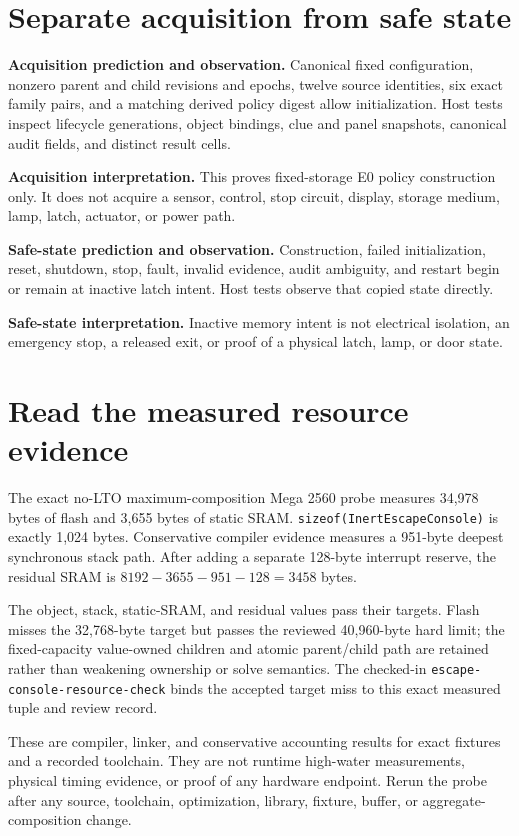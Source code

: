 \documentclass[10pt]{article}
\begin{document}
\section{Separate acquisition from safe state}
\textbf{Acquisition prediction and observation.} Canonical fixed
configuration, nonzero parent and child revisions and epochs, twelve source
identities, six exact family pairs, and a matching derived policy digest allow
initialization. Host tests inspect lifecycle generations, object bindings,
clue and panel snapshots, canonical audit fields, and distinct result cells.

\textbf{Acquisition interpretation.} This proves fixed-storage E0 policy
construction only. It does not acquire a sensor, control, stop circuit,
display, storage medium, lamp, latch, actuator, or power path.

\textbf{Safe-state prediction and observation.} Construction, failed
initialization, reset, shutdown, stop, fault, invalid evidence, audit
ambiguity, and restart begin or remain at inactive latch intent. Host tests
observe that copied state directly.

\textbf{Safe-state interpretation.} Inactive memory intent is not electrical
isolation, an emergency stop, a released exit, or proof of a physical latch,
lamp, or door state.

\section{Read the measured resource evidence}
The exact no-LTO maximum-composition Mega 2560 probe measures 34,978 bytes of
flash and 3,655 bytes of static SRAM.
\texttt{sizeof(InertEscapeConsole)} is exactly 1,024 bytes. Conservative
compiler evidence measures a 951-byte deepest synchronous stack path.
After adding a separate 128-byte interrupt reserve, the residual SRAM is
\(8192-3655-951-128=3458\) bytes.

The object, stack, static-SRAM, and residual values pass their targets. Flash
misses the 32,768-byte target but passes the reviewed 40,960-byte hard limit;
the fixed-capacity value-owned children and atomic parent/child path are
retained rather than weakening ownership or solve semantics. The checked-in
\texttt{escape-console-resource-check} binds the accepted target miss to this
exact measured tuple and review record.

These are compiler, linker, and conservative accounting results for exact
fixtures and a recorded toolchain. They are not runtime high-water
measurements, physical timing evidence, or proof of any hardware endpoint.
Rerun the probe after any source, toolchain, optimization, library, fixture,
buffer, or aggregate-composition change.
\end{document}
